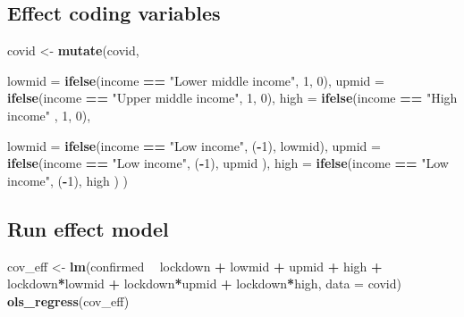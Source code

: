 \documentclass[]{article}
\newenvironment{Shaded}{\begin{snugshade}}{\end{snugshade}}
\newcommand{\KeywordTok}[1]{\textcolor[rgb]{0.13,0.29,0.53}{\textbf{#1}}}
\newcommand{\DataTypeTok}[1]{\textcolor[rgb]{0.13,0.29,0.53}{#1}}
\newcommand{\DecValTok}[1]{\textcolor[rgb]{0.00,0.00,0.81}{#1}}
\newcommand{\StringTok}[1]{\textcolor[rgb]{0.31,0.60,0.02}{#1}}
\newcommand{\OperatorTok}[1]{\textcolor[rgb]{0.81,0.36,0.00}{\textbf{#1}}}
\newcommand{\NormalTok}[1]{#1}
\begin{document}
\subsection{Effect coding variables}\label{effect-coding-variables}

\begin{Shaded}
\begin{Highlighting}[]
\NormalTok{covid <-}\StringTok{ }\KeywordTok{mutate}\NormalTok{(covid,}
              
               \DataTypeTok{lowmid =} \KeywordTok{ifelse}\NormalTok{(income }\OperatorTok{==}\StringTok{ "Lower middle income"}\NormalTok{, }\DecValTok{1}\NormalTok{, }\DecValTok{0}\NormalTok{),}
               \DataTypeTok{upmid  =} \KeywordTok{ifelse}\NormalTok{(income }\OperatorTok{==}\StringTok{ "Upper middle income"}\NormalTok{, }\DecValTok{1}\NormalTok{, }\DecValTok{0}\NormalTok{),}
               \DataTypeTok{high   =} \KeywordTok{ifelse}\NormalTok{(income }\OperatorTok{==}\StringTok{ "High income"}\NormalTok{        , }\DecValTok{1}\NormalTok{, }\DecValTok{0}\NormalTok{),}
              
              \DataTypeTok{lowmid =} \KeywordTok{ifelse}\NormalTok{(income }\OperatorTok{==}\StringTok{ "Low income"}\NormalTok{, (}\OperatorTok{-}\DecValTok{1}\NormalTok{), lowmid),}
              \DataTypeTok{upmid  =} \KeywordTok{ifelse}\NormalTok{(income }\OperatorTok{==}\StringTok{ "Low income"}\NormalTok{, (}\OperatorTok{-}\DecValTok{1}\NormalTok{), upmid ),}
              \DataTypeTok{high   =} \KeywordTok{ifelse}\NormalTok{(income }\OperatorTok{==}\StringTok{ "Low income"}\NormalTok{, (}\OperatorTok{-}\DecValTok{1}\NormalTok{), high  )}
\NormalTok{              ) }
\end{Highlighting}
\end{Shaded}

\subsection{Run effect model}\label{run-effect-model}

\begin{Shaded}
\begin{Highlighting}[]
\NormalTok{cov_eff <-}\StringTok{ }\KeywordTok{lm}\NormalTok{(confirmed }\OperatorTok{~}\StringTok{  }\NormalTok{lockdown }\OperatorTok{+}\StringTok{ }\NormalTok{lowmid }\OperatorTok{+}\StringTok{ }\NormalTok{upmid }\OperatorTok{+}\StringTok{ }\NormalTok{high }\OperatorTok{+}\StringTok{ }\NormalTok{lockdown}\OperatorTok{*}\NormalTok{lowmid }\OperatorTok{+}\StringTok{ }\NormalTok{lockdown}\OperatorTok{*}\NormalTok{upmid }\OperatorTok{+}\StringTok{ }\NormalTok{lockdown}\OperatorTok{*}\NormalTok{high, }
              \DataTypeTok{data =}\NormalTok{ covid)}
\KeywordTok{ols_regress}\NormalTok{(cov_eff)}
\end{Highlighting}
\end{Shaded}
\end{document}
